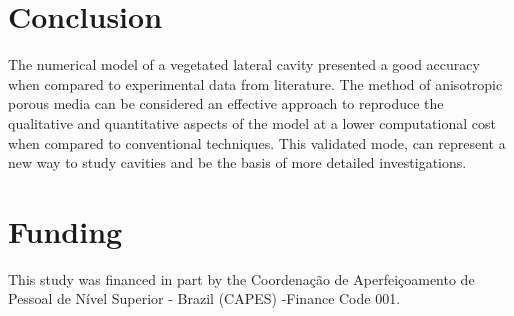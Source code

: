 \section{Conclusion}
The numerical model of a vegetated lateral cavity presented a good accuracy when compared to experimental data from literature. The method of anisotropic porous media can be considered an effective approach to reproduce the qualitative and quantitative aspects of the model at a lower computational cost when compared to conventional techniques. This validated mode, can represent a new way to study cavities and be the basis of more detailed investigations.
\section*{Funding}
This study was financed in part by the Coordenação de Aperfeiçoamento de Pessoal de Nível Superior - Brazil (CAPES) -Finance Code 001.
\printbibliography[segment=\therefsegment,heading=subbibliography, title={References}]
